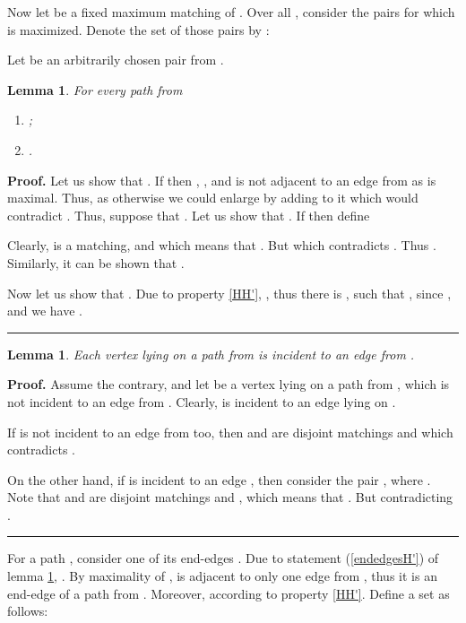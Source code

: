 \documentclass[a4paper, 12pt]{article}
\newtheorem{lemmasection}[definition]{Lemma}
\newenvironment{proof}[1][Proof]{\noindent\textbf{#1.} }{\ \rule{0.5em}{0.5em}}
\begin{document}
\bigskip

Now let  be a fixed maximum matching of . Over all , consider the pairs  for which  is maximized. Denote the set of those pairs by :


Let  be an arbitrarily chosen pair from .

\begin{lemmasection}\label{MHmain_property}
For every path  from

\renewcommand{\labelenumi}{(\arabic{enumi})}
\begin{enumerate}
\item \label{endedgesH'} ;
\item \label{l>=3} .
\end{enumerate}
\end{lemmasection}
\begin{proof}
Let us show that . If  then , , and  is not adjacent to an edge from 
as  is maximal. Thus,  as otherwise we could enlarge
 by adding  to it which would contradict . Thus, suppose that . Let us show that . If  then define


Clearly,  is a matching, and  which means that . But  which contradicts . Thus . Similarly, it can be shown
that .

Now let us show that . Due to property \ref{HH'},
, thus there is 
, such that , since
, and we have .
\end{proof}

\begin{lemmasection}\label{M_HandH's}
Each vertex lying on a path from  is incident to an
edge from .
\end{lemmasection}
\begin{proof}
Assume the contrary, and let  be a vertex lying on a path 
from , which is not incident to an edge from .
Clearly,  is incident to an edge  lying on .

If  is not incident to an edge from  too, then  and  are disjoint matchings and  which contradicts .

On the other hand, if  is incident to an edge , then
consider the pair , where . Note that  and  are disjoint matchings and
, which means that . But  contradicting .
\end{proof}

For a path , consider one of its end-edges . Due to statement (\ref{endedgesH'}) of lemma
\ref{MHmain_property}, . By maximality of , 
is adjacent to only one edge from , thus it is an end-edge of a
path  from . Moreover,  according to property \ref{HH'}. Define a set  as follows: 
\end{document}
